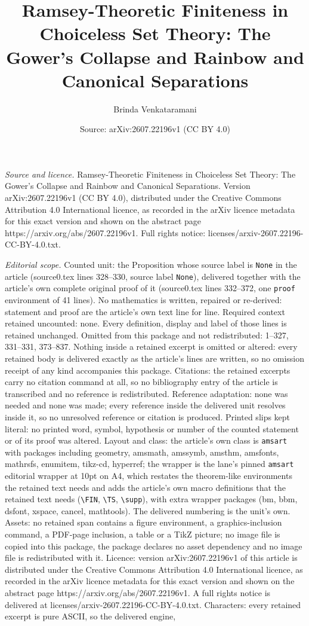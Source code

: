 \documentclass[10pt,a4paper]{amsart}
\title[Ramsey-Theoretic Finiteness in Choiceless Set Theory: The Go]{Ramsey-Theoretic Finiteness in Choiceless Set Theory: The Gower's Collapse and Rainbow and Canonical Separations}
\author{Brinda Venkataramani}
\date{Source: arXiv:2607.22196v1 (CC BY 4.0)}
\begin{document}
\maketitle

\noindent\emph{Source and licence.} Ramsey-Theoretic Finiteness in Choiceless Set Theory: The Gower's Collapse and Rainbow and Canonical Separations. Version arXiv:2607.22196v1 (CC BY 4.0), distributed under the Creative Commons Attribution 4.0 International licence, as recorded in the arXiv licence metadata for this exact version and shown on the abstract page https://arxiv.org/abs/2607.22196v1. Full rights notice: licenses/arxiv-2607.22196-CC-BY-4.0.txt.\par\smallskip

\noindent\textit{Editorial scope.} Counted unit: the Proposition whose source label is \texttt{None} in the article (source0.tex lines 328--330, source label \texttt{None}), delivered together with the article's own complete original proof of it (source0.tex lines 332--372, one \texttt{proof} environment of 41 lines). No mathematics is written, repaired or re-derived: statement and proof are the article's own text line for line. Required context retained uncounted: none. Every definition, display and label of those lines is retained unchanged. Omitted from this package and not redistributed: 1--327, 331--331, 373--837. Nothing inside a retained excerpt is omitted or altered: every retained body is delivered exactly as the article's lines are written, so no omission receipt of any kind accompanies this package. Citations: the retained excerpts carry no citation command at all, so no bibliography entry of the article is transcribed and no reference is redistributed. Reference adaptation: none was needed and none was made; every reference inside the delivered unit resolves inside it, so no unresolved reference or citation is produced. Printed slips kept literal: no printed word, symbol, hypothesis or number of the counted statement or of its proof was altered. Layout and class: the article's own class is \texttt{amsart} with packages including geometry, amsmath, amssymb, amsthm, amsfonts, mathrsfs, enumitem, tikz-cd, hyperref; the wrapper is the lane's pinned \texttt{amsart} editorial wrapper at 10pt on A4, which restates the theorem-like environments the retained text needs and adds the article's own macro definitions that the retained text needs (\texttt{\textbackslash FIN}, \texttt{\textbackslash TS}, \texttt{\textbackslash supp}), with extra wrapper packages (bm, bbm, dsfont, xspace, cancel, mathtools). The delivered numbering is the unit's own. Assets: no retained span contains a figure environment, a graphics-inclusion command, a PDF-page inclusion, a table or a TikZ picture; no image file is copied into this package, the package declares no asset dependency and no image file is redistributed with it. Licence: version arXiv:2607.22196v1 of this article is distributed under the Creative Commons Attribution 4.0 International licence, as recorded in the arXiv licence metadata for this exact version and shown on the abstract page https://arxiv.org/abs/2607.22196v1. A full rights notice is delivered at licenses/arxiv-2607.22196-CC-BY-4.0.txt. Characters: every retained excerpt is pure ASCII, so the delivered engine, 
\end{document}
